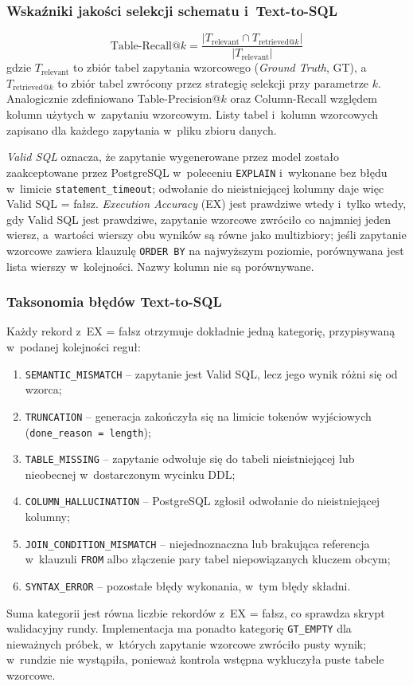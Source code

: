 \subsubsection{Wskaźniki jakości selekcji schematu i~Text-to-SQL}
\begin{equation}
\text{Table-Recall@}k = \frac{|T_{\text{relevant}} \cap T_{\text{retrieved@}k}|}{|T_{\text{relevant}}|}
\label{eq:recall_at_k}
\end{equation}
gdzie $T_{\text{relevant}}$ to zbiór tabel zapytania wzorcowego (\emph{Ground Truth}, GT), a~$T_{\text{retrieved@}k}$ to zbiór tabel zwrócony przez strategię selekcji przy parametrze $k$. Analogicznie zdefiniowano Table-Precision@$k$ oraz Column-Recall względem kolumn użytych w~zapytaniu wzorcowym. Listy tabel i~kolumn wzorcowych zapisano dla każdego zapytania w~pliku zbioru danych.

\emph{Valid SQL} oznacza, że zapytanie wygenerowane przez model zostało zaakceptowane przez PostgreSQL w~poleceniu \texttt{EXPLAIN} i~wykonane bez błędu w~limicie \texttt{statement\_timeout}; odwołanie do nieistniejącej kolumny daje więc Valid SQL = fałsz. \emph{Execution Accuracy} (EX) jest prawdziwe wtedy i~tylko wtedy, gdy Valid SQL jest prawdziwe, zapytanie wzorcowe zwróciło co najmniej jeden wiersz, a~wartości wierszy obu wyników są równe jako multizbiory; jeśli zapytanie wzorcowe zawiera klauzulę \texttt{ORDER BY} na najwyższym poziomie, porównywana jest lista wierszy w~kolejności. Nazwy kolumn nie są porównywane.

\subsubsection{Taksonomia błędów Text-to-SQL}
Każdy rekord z~EX = fałsz otrzymuje dokładnie jedną kategorię, przypisywaną w~podanej kolejności reguł:
\begin{enumerate}
    \item \texttt{SEMANTIC\_MISMATCH} -- zapytanie jest Valid SQL, lecz jego wynik różni się od wzorca;
    \item \texttt{TRUNCATION} -- generacja zakończyła się na limicie tokenów wyjściowych (\texttt{done\_reason = length});
    \item \texttt{TABLE\_MISSING} -- zapytanie odwołuje się do tabeli nieistniejącej lub nieobecnej w~dostarczonym wycinku DDL;
    \item \texttt{COLUMN\_HALLUCINATION} -- PostgreSQL zgłosił odwołanie do nieistniejącej kolumny;
    \item \texttt{JOIN\_CONDITION\_MISMATCH} -- niejednoznaczna lub brakująca referencja w~klauzuli \texttt{FROM} albo złączenie pary tabel niepowiązanych kluczem obcym;
    \item \texttt{SYNTAX\_ERROR} -- pozostałe błędy wykonania, w~tym błędy składni.
\end{enumerate}
Suma kategorii jest równa liczbie rekordów z~EX = fałsz, co sprawdza skrypt walidacyjny rundy. Implementacja ma ponadto kategorię \texttt{GT\_EMPTY} dla nieważnych próbek, w~których zapytanie wzorcowe zwróciło pusty wynik; w~rundzie nie wystąpiła, ponieważ kontrola wstępna wykluczyła puste tabele wzorcowe.

